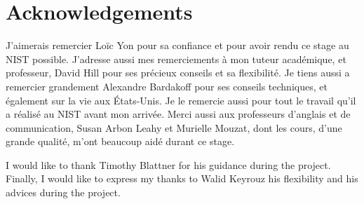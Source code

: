
\pagestyle{empty}
\section*{Acknowledgements}

J'aimerais remercier Loïc Yon pour sa confiance et pour avoir rendu ce stage au
NIST possible. J'adresse aussi mes remerciements à mon tuteur académique, et
professeur, David Hill pour ses précieux conseils et sa flexibilité. Je tiens
aussi a remercier grandement Alexandre Bardakoff pour ses conseils techniques,
et également sur la vie aux États-Unis. Je le remercie aussi pour tout le
travail qu'il a réalisé au NIST avant mon arrivée. Merci aussi aux professeurs
d'anglais et de communication, Susan Arbon Leahy et Murielle Mouzat, dont les
cours, d'une grande qualité, m'ont beaucoup aidé durant ce stage.

I would like to thank Timothy Blattner for his guidance during the project.
Finally, I would like to express my thanks to Walid Keyrouz his flexibility and
his advices during the project.
